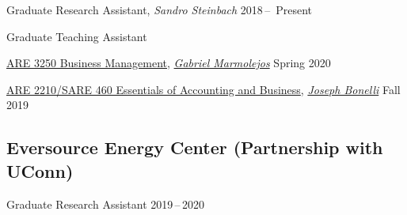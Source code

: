 \documentclass[10.5 pt,letterpaper]{article}
\renewenvironment{itemize}{
	\begin{list}{}{
			\setlength{\leftmargin}{1.5em}
		}
	}{
	\end{list}
}
\begin{document}
	\begin{itemize}
		\item[-] Graduate Research Assistant,    \textit{Sandro Steinbach} 	\hfill    2018\,--\, Present
		
	 
		 	
	 
 
		
 
	
				 
		
		\item[-] Graduate  Teaching Assistant
		
		\href{https://catalog.uconn.edu/directory-of-courses/course/}{ARE 3250 Business Management},
		\href{https://are.uconn.edu/person/gabriel-marmolejos/}{\textit{Gabriel Marmolejos}}
		\hfill   Spring 2020
		
		\href{https://catalog.uconn.edu/directory-of-courses/course/}{ARE 2210/SARE 460 Essentials of Accounting and Business},
		\href{https://cahnr.uconn.edu/person/joseph-bonelli/}{\textit{Joseph Bonelli}}
		\hfill   Fall 2019
	\end{itemize}
	
	
	\subsection*{Eversource Energy Center  (Partnership with UConn) }
	
	\begin{itemize}
		\item[-] Graduate Research Assistant      \hfill 2019\,--\,2020
		
	\end{itemize}
	
\end{document}
